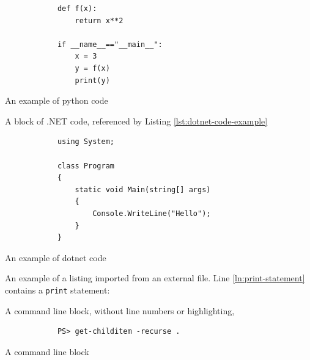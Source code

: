 \documentclass[a4paper, ]{article}
\begin{document}
    \begin{listing}[H]
        \begin{verbatim}
            def f(x):
                return x**2
            
            if __name__=="__main__":
                x = 3
                y = f(x)
                print(y)
        \end{verbatim}
        \caption{An example of python code}
        \label{lst:python-code-example}
    \end{listing}

    A block of .NET code, referenced by Listing
    \ref{lst:dotnet-code-example}

    \begin{listing}[H]
        \begin{verbatim}
            using System;
            
            class Program
            {
                static void Main(string[] args)
                {
                    Console.WriteLine("Hello");
                }
            }
        \end{verbatim}
        \caption{An example of dotnet code}
        \label{lst:dotnet-code-example}
    \end{listing}

    An example of a listing imported from an external file. Line
    \ref{ln:print-statement} contains a \texttt{print}
    statement:


    A command line block, without line numbers or highlighting,

    \begin{listing}[H]
        \begin{verbatim}
            PS> get-childitem -recurse .
        \end{verbatim}
        \caption{A command line block}
        \label{lst:command-line-block}
    \end{listing}
\end{document}
